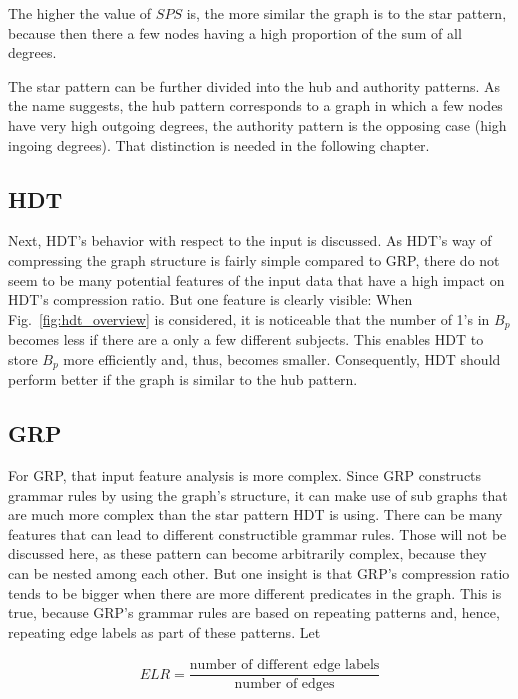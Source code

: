 The higher the value of $SPS$ is, the more similar the graph is to the star pattern, because then there a few nodes having a high proportion of the sum of all degrees.

The star pattern can be further divided into the hub and authority patterns. As the name suggests, the hub pattern corresponds to a graph in which a few nodes have very high outgoing degrees, the authority pattern is the opposing case (high ingoing degrees). That distinction is needed in the following chapter.

\subsection{HDT}

Next, HDT's behavior with respect to the input is discussed. As HDT's way of compressing the graph structure is fairly simple compared to GRP, there do not seem to be many potential features of the input data that have a high impact on HDT's compression ratio. But one feature is clearly visible: When Fig.~\ref{fig:hdt_overview} is considered, it is noticeable that the number of 1's in $B_p$ becomes less if there are a only a few different subjects. This enables HDT to store $B_p$ more efficiently and, thus,  becomes smaller. Consequently, HDT should perform better if the graph is similar to the hub pattern.

\subsection{GRP}\label{sec:approachFeaturesGRP}
For GRP, that input feature analysis is more complex. Since GRP constructs grammar rules by using the graph's structure, it can make use of sub graphs that are much more complex than the star pattern HDT is using. There can be many features that can lead to different constructible grammar rules. Those will not be discussed here, as these pattern can become arbitrarily complex, because they can be nested among each other. But one insight is that GRP's compression ratio tends to be bigger when there are more different predicates in the graph. This is true, because GRP's grammar rules are based on repeating patterns and, hence, repeating edge labels as part of these patterns. Let
 
\begin{align*}
ELR = \dfrac{\text{number of different edge labels}}{\text{number of edges}} 
\end{align*}

